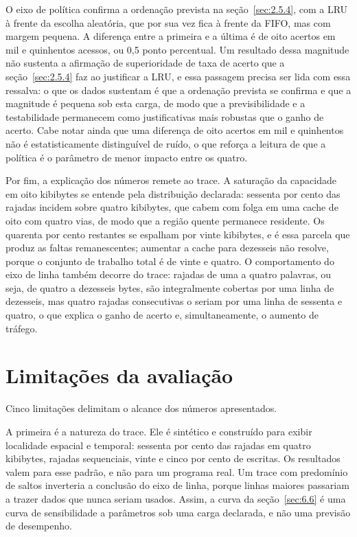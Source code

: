 O eixo de política confirma a ordenação prevista na seção~\ref{sec:2.5.4}, com a LRU à frente da escolha aleatória, que por sua vez fica à frente da FIFO, mas com margem pequena. A diferença entre a primeira e a última é de oito acertos em mil e quinhentos acessos, ou 0,5 ponto percentual. Um resultado dessa magnitude não sustenta a afirmação de superioridade de taxa de acerto que a seção~\ref{sec:2.5.4} faz ao justificar a LRU, e essa passagem precisa ser lida com essa ressalva: o que os dados sustentam é que a ordenação prevista se confirma e que a magnitude é pequena sob esta carga, de modo que a previsibilidade e a testabilidade permanecem como justificativas mais robustas que o ganho de acerto. Cabe notar ainda que uma diferença de oito acertos em mil e quinhentos não é estatisticamente distinguível de ruído, o que reforça a leitura de que a política é o parâmetro de menor impacto entre os quatro.

Por fim, a explicação dos números remete ao trace. A saturação da capacidade em oito kibibytes se entende pela distribuição declarada: sessenta por cento das rajadas incidem sobre quatro kibibytes, que cabem com folga em uma cache de oito com quatro vias, de modo que a região quente permanece residente. Os quarenta por cento restantes se espalham por vinte kibibytes, e é essa parcela que produz as faltas remanescentes; aumentar a cache para dezesseis não resolve, porque o conjunto de trabalho total é de vinte e quatro. O comportamento do eixo de linha também decorre do trace: rajadas de uma a quatro palavras, ou seja, de quatro a dezesseis bytes, são integralmente cobertas por uma linha de dezesseis, mas quatro rajadas consecutivas o seriam por uma linha de sessenta e quatro, o que explica o ganho de acerto e, simultaneamente, o aumento de tráfego.

\section{Limitações da avaliação}\label{sec:6.8}

Cinco limitações delimitam o alcance dos números apresentados.

A primeira é a natureza do trace. Ele é sintético e construído para exibir localidade espacial e temporal: sessenta por cento das rajadas em quatro kibibytes, rajadas sequenciais, vinte e cinco por cento de escritas. Os resultados valem para esse padrão, e não para um programa real. Um trace com predomínio de saltos inverteria a conclusão do eixo de linha, porque linhas maiores passariam a trazer dados que nunca seriam usados. Assim, a curva da seção~\ref{sec:6.6} é uma curva de sensibilidade a parâmetros sob uma carga declarada, e não uma previsão de desempenho.

